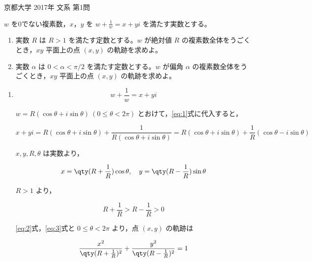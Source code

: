 \documentclass[a4paper]{ltjsarticle}
\begin{document}
\begin{itembox}[l]{京都大学 2017年 文系 第1問}

    $w$ を0でない複素数，$x$，$y$ を $w+\frac{1}{w}=x+yi$ を満たす実数とする。

    \begin{enumerate}[label=(\arabic*)]
        \item 実数 $R$ は $R>1$ を満たす定数とする。$w$ が絶対値 $R$ の複素数全体をうごくとき，$xy$ 平面上の点 $(x,y)$ の軌跡を求めよ。
        \item 実数 $\alpha$ は $0<\alpha<\pi/2$ を満たす定数とする。$w$ が偏角 $\alpha$ の複素数全体をうごくとき，$xy$ 平面上の点 $(x,y)$ の軌跡を求めよ。
    \end{enumerate}
\end{itembox}

\begin{enumerate}[label=(\arabic*)]
    \item
          \begin{equation}
              w+\frac{1}{w}=x+yi\label{eq:1}
          \end{equation}

          $w=R(\cos\theta+i\sin\theta)\ (0\leq \theta<2\pi)$ とおけて，\eqref{eq:1}式に代入すると，

          \begin{equation*}
              x+yi=R(\cos\theta+i\sin\theta)+\frac{1}{R(\cos\theta+i\sin\theta)}=R(\cos\theta+i\sin\theta)+\frac{1}{R}(\cos\theta-i\sin\theta)
          \end{equation*}

          $x, y, R, \theta$ は実数より，

          \begin{equation}
              x=\qty(R+\frac{1}{R})\cos\theta,\quad y=\qty(R-\frac{1}{R})\sin\theta\label{eq:2}
          \end{equation}

          $R>1$ より，

          \begin{equation}
              R+\frac{1}{R}>R-\frac{1}{R}>0\label{eq:3}
          \end{equation}

          \eqref{eq:2}式，\eqref{eq:3}式と $0\leq \theta<2\pi$ より，点 $(x,y)$ の軌跡は

          \begin{equation*}
              \frac{x^2}{\qty(R+\frac{1}{R})^2}+\frac{y^2}{\qty(R-\frac{1}{R})^2}=1
          \end{equation*}


\end{enumerate}
\end{document}
